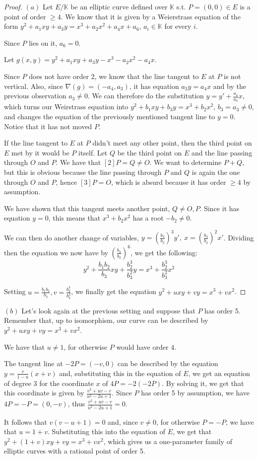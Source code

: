 \documentclass{article}
\newcommand{\numberset}{\mathbb}
\newcommand{\K}{\numberset{K}}
\begin{document}
\begin{proof}
    $(a)$ Let $E/\K$ be an elliptic curve defined over $\K$ s.t. $P=(0,0)\in E$
    is a point of order $\geq 4$. We know that it is given by a Weierstrass
    equation of the form $y^2+a_1xy+a_3y=x^3+a_2x^2+a_4x+a_6$, $a_i\in\K$ for
    every $i$.

    Since $P$ lies on it, $a_6=0$.

    Let $g(x,y)=y^2+a_1xy+a_3y-x^3-a_2x^2-a_4x$.

    Since $P$ does not have order 2, we know that the line tangent to $E$ at $P$
    is not vertical. Also, since $\nabla(g)=(-a_4,a_3)$, it has equation
    $a_3y=a_4x$ and by the previous observation $a_3\neq 0$. We can therefore do
    the substitution $y=y'+\frac{a_4}{a_3}x$, which turns our Weirstrass
    equation into $y^2+b_1xy+b_3y=x^3+b_2x^2$, $b_3=a_3\neq 0$, and changes the
    equation of the previously mentioned tangent line to $y=0$. Notice that it
    has not moved $P$.

    If the line tangent to $E$ at $P$ didn't meet any other point, then the
    third point on $E$ met by it would be $P$ itself. Let $Q$ be the third point
    on $E$ and the line passing through $O$ and $P$. We have that $[2]P=Q\neq
    O$. We want to determine $P+Q$, but this is obvious because the line passing
    through $P$ and $Q$ is again the one through $O$ and $P$, hence $[3]P=O$,
    which is absurd because it has order $\geq 4$ by assumption.

    We have shown that this tangent meets another point, $Q\neq O,P$. Since it
    has equation $y=0$, this means that $x^3+b_2x^2$ has a root $-b_2\neq 0$.

    We can then do another change of variables,
    $y=(\frac{b_3}{b_2})^3y',\ x=(\frac{b_3}{b_2})^2x'$. Dividing then the
    equation we now have by $(\frac{b_3}{b_2})^6$, we get the following:
    $$y^2+\frac{b_1b_2}{b_3}xy+\frac{b_2^3}{b_3^2}y=x^3+\frac{b_2^3}{b_3^2}x^2$$
    
    Setting $u=\frac{b_1b_2}{b_3},v=\frac{b_2^3}{b_3^2}$, we finally get the
    equation $y^2+uxy+vy=x^3+vx^2$.
\end{proof}

$(b)$ Let's look again at the previous setting and suppose that $P$ has order 5.
Remember that, up to isomorphism, our curve can be described by
$y^2+uxy+vy=x^3+vx^2$.

We have that $u\neq 1$, for otherwise $P$ would have order 4.

The tangent line at $-2P=(-v,0)$ can be described by the equation
$y=\frac{v}{1-u}(x+v)$ and, substituting this in the equation of $E$, we get
an equation of degree 3 for the coordinate $x$ of $4P=-2(-2P)$. By solving
it, we get that this coordinate is given by $\frac{v^2+uv-v}{u^2-2u+1}$.
Since $P$ has order 5 by assumption, we have $4P=-P=(0,-v)$, thus 
$\frac{v^2+uv-v}{u^2-2u+1}=0$.

It follows that $v(v-u+1)=0$ and, since $v\neq 0$, for otherwise $P=-P$, we
have that $u=1+v$. Substituting this into the equation of $E$, we get that
$y^2+(1+v)xy+vy=x^3+vx^2$, which gives us a one-parameter family of elliptic
curves with a rational point of order 5.

\printbibliography
\end{document}
